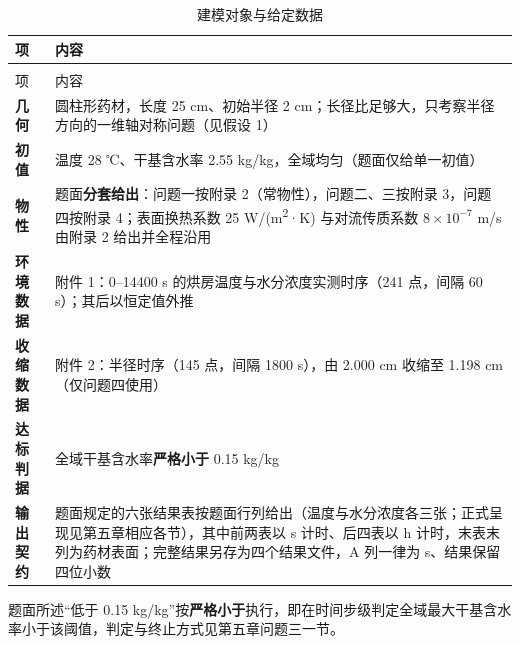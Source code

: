 \begin{longtable}{>{\raggedleft\arraybackslash}m{\dimexpr 0.196\tblw\relax}>{\raggedright\arraybackslash}m{\dimexpr 0.804\tblw\relax}}
  \caption{建模对象与给定数据}\label{tab:1-1}\\
  \toprule
    项 & 内容 \\
  \midrule
  \endfirsthead
  \multicolumn{2}{r}{\footnotesize（续）}\\
  \toprule
    项 & 内容 \\
  \midrule
  \endhead
  \bottomrule
  \endfoot
  \bottomrule
  \endlastfoot
  \textbf{几何} & 圆柱形药材，长度 25 cm、初始半径 2 cm；长径比足够大，只考察半径方向的一维轴对称问题（见假设 1） \\
  \textbf{初值} & 温度 28 ℃、干基含水率 2.55 kg/kg，全域均匀（题面仅给单一初值） \\
  \textbf{物性} & 题面\textbf{分套给出}：问题一按附录 2（常物性），问题二、三按附录 3，问题四按附录 4；表面换热系数 25 W/(m\textsuperscript{2}·K) 与对流传质系数 $8\times10^{-7}$ m/s 由附录 2 给出并全程沿用 \\
  \textbf{环境数据} & 附件 1：0–14400 s 的烘房温度与水分浓度实测时序（241 点，间隔 60 s）；其后以恒定值外推 \\
  \textbf{收缩数据} & 附件 2：半径时序（145 点，间隔 1800 s），由 2.000 cm 收缩至 1.198 cm（仅问题四使用） \\
  \textbf{达标判据} & 全域干基含水率\textbf{严格小于} 0.15 kg/kg \\
  \textbf{输出契约} & 题面规定的六张结果表按题面行列给出（温度与水分浓度各三张；正式呈现见第五章相应各节），其中前两表以 s 计时、后四表以 h 计时，末表末列为药材表面；完整结果另存为四个结果文件，A 列一律为 s、结果保留四位小数 \\
\end{longtable}

题面所述“低于 0.15 kg/kg”按\textbf{严格小于}执行，即在时间步级判定全域最大干基含水率小于该阈值，判定与终止方式见第五章问题三一节。

